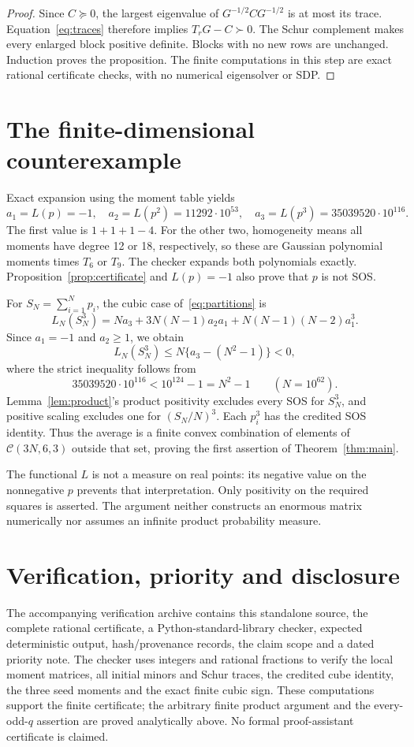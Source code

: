 \documentclass[11pt]{article}
\newcommand{\C}{\mathcal C}
\begin{document}
\begin{proof}
Since $C\succeq0$, the largest eigenvalue of
$G^{-1/2}CG^{-1/2}$ is at most its trace. Equation~\eqref{eq:traces}
therefore implies $T_rG-C\succ0$. The Schur complement makes every
enlarged block positive definite. Blocks with no new rows are unchanged.
Induction proves the proposition. The finite computations in this step
are exact rational certificate checks, with no numerical eigensolver or SDP.
\end{proof}

\section{The finite-dimensional counterexample}
Exact expansion using the moment table yields
\begin{equation}\label{eq:values}
 a_1=L(p)=-1,\quad a_2=L(p^2)=11292\cdot10^{53},\quad
 a_3=L(p^3)=35039520\cdot10^{116}.
\end{equation}
The first value is $1+1+1-4$. For the other two, homogeneity means all
moments have degree 12 or 18, respectively, so these are Gaussian polynomial
moments times $T_6$ or $T_9$. The checker expands both polynomials exactly.
Proposition~\ref{prop:certificate} and $L(p)=-1$ also prove that $p$ is not SOS.

For $S_N=\sum_{i=1}^N p_i$, the cubic case of~\eqref{eq:partitions} is
\[
 L_N(S_N^3)=Na_3+3N(N-1)a_2a_1+N(N-1)(N-2)a_1^3.
\]
Since $a_1=-1$ and $a_2\ge1$, we obtain
\[
 L_N(S_N^3)\le N\{a_3-(N^2-1)\}<0,
\]
where the strict inequality follows from
\[
 35039520\cdot10^{116}<10^{124}-1=N^2-1\qquad(N=10^{62}).
\]
Lemma~\ref{lem:product}'s product positivity excludes every SOS for
$S_N^3$, and positive scaling excludes one for $(S_N/N)^3$.
Each $p_i^3$ has the credited SOS identity. Thus the average is a finite
convex combination of elements of $\C(3N,6,3)$ outside that set, proving
the first assertion of Theorem~\ref{thm:main}.

The functional $L$ is not a measure on real points: its negative value on
the nonnegative $p$ prevents that interpretation. Only positivity on the
required squares is asserted. The argument neither constructs an enormous
matrix numerically nor assumes an infinite product probability measure.

\section{Verification, priority and disclosure}
The accompanying verification archive contains this standalone source,
the complete rational certificate, a Python-standard-library checker,
expected deterministic output, hash/provenance records, the claim scope
and a dated priority note. The checker uses integers and rational fractions
to verify the local moment matrices, all initial minors and Schur traces,
the credited cube identity, the three seed moments and the exact finite
cubic sign. These computations support the finite certificate; the
arbitrary finite product argument and the every-odd-$q$ assertion are
proved analytically above. No formal proof-assistant certificate is claimed.
\end{document}
